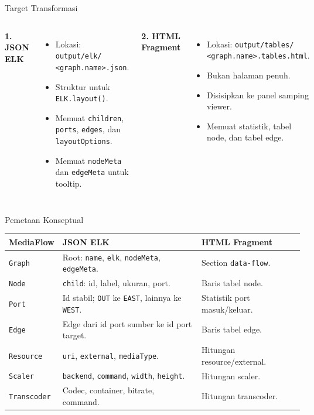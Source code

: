 \documentclass[aspectratio=169, table]{beamer}
\begin{document}
\begin{frame}{Target Transformasi}
\vspace{6pt}
\begin{columns}[T]
\textbf{1. JSON ELK}
\begin{itemize}
  \item Lokasi: \texttt{output/elk/}\\\texttt{<graph.name>.json}.
  \item Struktur untuk \texttt{ELK.layout()}.
  \item Memuat \texttt{children}, \texttt{ports}, \texttt{edges}, dan \texttt{layoutOptions}.
  \item Memuat \texttt{nodeMeta} dan \texttt{edgeMeta} untuk tooltip.
\end{itemize}

\textbf{2. HTML Fragment}
\begin{itemize}
  \item Lokasi: \texttt{output/tables/}\\\texttt{<graph.name>.tables.html}.
  \item Bukan halaman penuh.
  \item Disisipkan ke panel samping viewer.
  \item Memuat statistik, tabel node, dan tabel edge.
\end{itemize}
\end{columns}
\end{frame}

\begin{frame}{Pemetaan Konseptual}
\vspace{2pt}
\tiny
\begin{tabular}{|p{}|p{}|p{}|}
\hline
\rowcolor{black!8}
\textbf{MediaFlow} & \textbf{JSON ELK} & \textbf{HTML Fragment} \\
\hline
\texttt{Graph} & Root: \texttt{name}, \texttt{elk}, \texttt{nodeMeta}, \texttt{edgeMeta}. & Section \texttt{data-flow}. \\
\hline
\texttt{Node} & \texttt{child}: id, label, ukuran, port. & Baris tabel node. \\
\hline
\texttt{Port} & Id stabil; \texttt{OUT} ke \texttt{EAST}, lainnya ke \texttt{WEST}. & Statistik port masuk/keluar. \\
\hline
\texttt{Edge} & Edge dari id port sumber ke id port target. & Baris tabel edge. \\
\hline
\texttt{Resource} & \texttt{uri}, \texttt{external}, \texttt{mediaType}. & Hitungan resource/external. \\
\hline
\texttt{Scaler} & \texttt{backend}, \texttt{command}, \texttt{width}, \texttt{height}. & Hitungan scaler. \\
\hline
\texttt{Transcoder} & Codec, container, bitrate, command. & Hitungan transcoder. \\
\hline
\end{tabular}
\end{frame}
\end{document}
